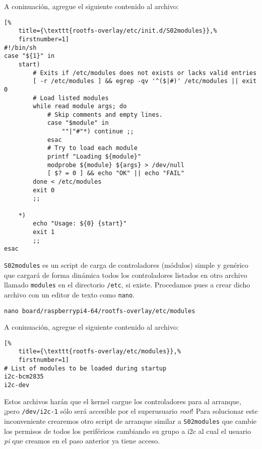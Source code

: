 \begin{samepage}
\noindent
A coninuación, agregue el siguiente contenido al archivo:

\noindent
\begin{minipage}{\columnwidth}
\begin{lstlisting}[%
	title={\texttt{rootfs-overlay/etc/init.d/S02modules}},%
	firstnumber=1]
#!/bin/sh
case "${1}" in
    start)
        # Exits if /etc/modules does not exists or lacks valid entries
        [ -r /etc/modules ] && egrep -qv '^($|#)' /etc/modules || exit 0
        # Load listed modules
        while read module args; do
            # Skip comments and empty lines.
            case "$module" in
                ""|"#"*) continue ;;
            esac
            # Try to load each module
            printf "Loading ${module}"
            modprobe ${module} ${args} > /dev/null
            [ $? = 0 ] && echo "OK" || echo "FAIL"
        done < /etc/modules
        exit 0
        ;;

    *)
        echo "Usage: ${0} {start}"
        exit 1
        ;;
esac
\end{lstlisting}
\end{minipage}
\end{samepage}

\texttt{S02modules} es un script de carga de controladores (módulos) simple y genérico que cargará de forma dinámica todos los controladores listados en otro archivo llamado \texttt{modules} en el directorio \texttt{/etc}, si existe.
Procedamos pues a crear dicho archivo con un editor de texto como \texttt{nano}.

\begin{Verbatim}[gobble=1]
	nano board/raspberrypi4-64/rootfs-overlay/etc/modules
\end{Verbatim}

\begin{samepage}
\noindent
A coninuación, agregue el siguiente contenido al archivo:

\noindent
\begin{minipage}{\columnwidth}
\begin{lstlisting}[%
	title={\texttt{rootfs-overlay/etc/modules}},%
	firstnumber=1]
# List of modules to be loaded during startup
i2c-bcm2835
i2c-dev
\end{lstlisting}
\end{minipage}
\end{samepage}

Estos archivos harán que el kernel cargue los controladores para \IIC{} al arranque, ¡pero \texttt{/dev/i2c-1} sólo será accesible por el superusuario \emph{root}!
Para solucionar este inconveniente crearemos otro script de arranque similar a \texttt{S02modules} que cambie los permisos de todos los periféricos \IIC{} cambiando su grupo a i2c al cual el usuario \emph{pi} que creamos en el paso anterior ya tiene acceso.

